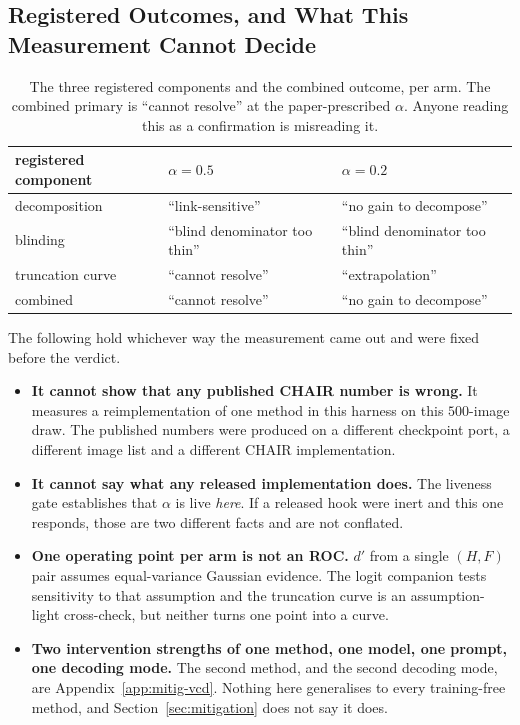 \subsection{Registered Outcomes, and What This Measurement Cannot Decide}
\label{app:mitig-verdict}

\begin{table}[htb]
\caption{The three registered components and the combined outcome, per arm. The combined primary is
``cannot resolve'' at the paper-prescribed $\alpha$. Anyone reading this as a confirmation is
misreading it.}
\label{tab:mdverdict}
\begin{center}
\small
\begin{tabular}{lll}
\toprule
registered component & $\alpha = 0.5$ & $\alpha = 0.2$ \\
\midrule
decomposition & ``link-sensitive'' & ``no gain to decompose'' \\
blinding & ``blind denominator too thin'' & ``blind denominator too thin'' \\
truncation curve & ``cannot resolve'' & ``extrapolation'' \\
\midrule
combined & ``cannot resolve'' & ``no gain to decompose'' \\
\bottomrule
\end{tabular}
\end{center}
\end{table}

The following hold whichever way the measurement came out and were fixed before the verdict.

\begin{itemize}
\itemsep0em
\item \textbf{It cannot show that any published CHAIR number is wrong.} It measures a
reimplementation of one method in this harness on this $500$-image draw. The published numbers were
produced on a different checkpoint port, a different image list and a different CHAIR
implementation.
\item \textbf{It cannot say what any released implementation does.} The liveness gate establishes
that $\alpha$ is live \emph{here}. If a released hook were inert and this one responds, those are
two different facts and are not conflated.
\item \textbf{One operating point per arm is not an ROC.} $d'$ from a single $(H, F)$ pair assumes
equal-variance Gaussian evidence. The logit companion tests sensitivity to that assumption and the
truncation curve is an assumption-light cross-check, but neither turns one point into a curve.
\item \textbf{Two intervention strengths of one method, one model, one prompt, one decoding mode.}
The second method, and the second decoding mode, are Appendix~\ref{app:mitig-vcd}.
Nothing here generalises to every training-free method, and Section~\ref{sec:mitigation} does not
say it does.
\end{itemize}

